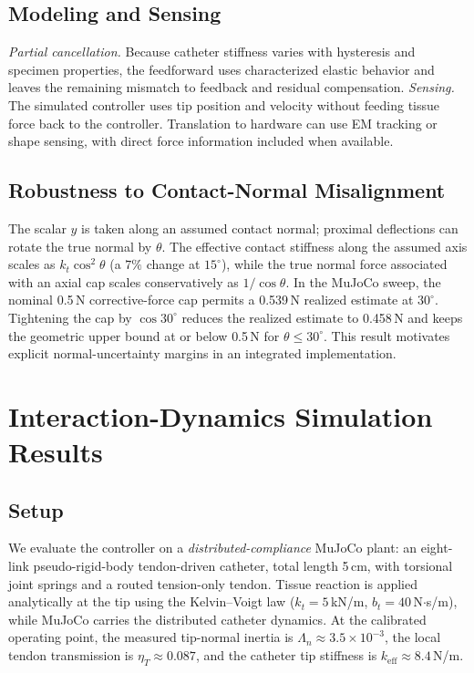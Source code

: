 \subsection{Modeling and Sensing}

\emph{Partial cancellation.} Because catheter stiffness varies with hysteresis and specimen properties, the feedforward uses characterized elastic behavior and leaves the remaining mismatch to feedback and residual compensation. \emph{Sensing.} The simulated controller uses tip position and velocity without feeding tissue force back to the controller. Translation to hardware can use EM tracking or shape sensing, with direct force information included when available.

\subsection{Robustness to Contact-Normal Misalignment}

The scalar $y$ is taken along an assumed contact normal; proximal deflections can rotate the true normal by $\theta$. The effective contact stiffness along the assumed axis scales as $k_t\cos^2\theta$ (a $7\%$ change at $15^\circ$), while the true normal force associated with an axial cap scales conservatively as $1/\cos\theta$. In the MuJoCo sweep, the nominal 0.5\,N corrective-force cap permits a 0.539\,N realized estimate at $30^\circ$. Tightening the cap by $\cos30^\circ$ reduces the realized estimate to 0.458\,N and keeps the geometric upper bound at or below 0.5\,N for $\theta\le30^\circ$. This result motivates explicit normal-uncertainty margins in an integrated implementation.

\section{Interaction-Dynamics Simulation Results}\label{sec:sim}

\subsection{Setup}

We evaluate the controller on a \emph{distributed-compliance} MuJoCo plant: an eight-link pseudo-rigid-body tendon-driven catheter, total length 5\,cm, with torsional joint springs and a routed tension-only tendon. Tissue reaction is applied analytically at the tip using the Kelvin--Voigt law ($k_t=5$\,kN/m, $b_t=40$\,N$\cdot$s/m), while MuJoCo carries the distributed catheter dynamics. At the calibrated operating point, the measured tip-normal inertia is $\Lambda_n\approx3.5\times10^{-3}$, the local tendon transmission is $\eta_T\approx0.087$, and the catheter tip stiffness is $k_{\text{eff}}\approx8.4$\,N/m.

